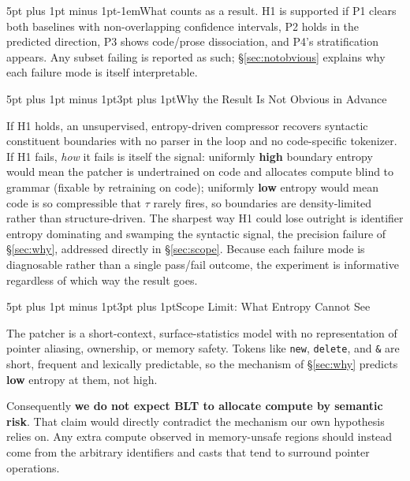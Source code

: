 \documentclass[9pt]{extarticle}
\makeatletter
\renewcommand\subsection{\@startsection{subsection}{2}{0pt}%
  {5pt plus 1pt minus 1pt}{3pt plus 1pt}{\normalfont\normalsize\bfseries}}
\renewcommand\paragraph{\@startsection{paragraph}{4}{0pt}%
  {5pt plus 1pt minus 1pt}{-1em}{\normalfont\normalsize\bfseries}}
\newcommand{\code}[1]{\texttt{\small #1}}
\makeatother
\begin{document}
\paragraph{What counts as a result.} H1 is supported if P1 clears both baselines
with non-overlapping confidence intervals, P2 holds in the predicted direction,
P3 shows code/prose dissociation, and P4's stratification appears. Any subset
failing is reported as such; \S\ref{sec:notobvious} explains why each failure mode
is itself interpretable.

\subsection{Why the Result Is Not Obvious in Advance}
\label{sec:notobvious}

If H1 holds, an unsupervised, entropy-driven compressor recovers syntactic
constituent boundaries with no parser in the loop and no code-specific
tokenizer. If H1 fails, \emph{how} it fails is itself the signal: uniformly
\textbf{high} boundary entropy would mean the patcher is undertrained on code
and allocates compute blind to grammar (fixable by retraining on code);
uniformly \textbf{low} entropy would mean code is so compressible that $\tau$
rarely fires, so boundaries are density-limited rather than structure-driven.
The sharpest way H1 could lose outright is identifier entropy dominating and
swamping the syntactic signal, the precision failure of \S\ref{sec:why},
addressed directly in \S\ref{sec:scope}. Because each failure mode is
diagnosable rather than a single pass/fail outcome, the experiment is
informative regardless of which way the result goes.

\subsection{Scope Limit: What Entropy Cannot See}
\label{sec:scope}

The patcher is a short-context, surface-statistics model with no representation of
pointer aliasing, ownership, or memory safety. Tokens like \code{new},
\code{delete}, \code{*} and \code{\&} are short, frequent and lexically
predictable, so the mechanism of \S\ref{sec:why} predicts \textbf{low} entropy at
them, not high.

Consequently \textbf{we do not expect BLT to allocate compute by semantic risk}.
That claim would directly contradict the mechanism our own hypothesis relies on.
Any extra compute observed in memory-unsafe regions should instead come from the
arbitrary identifiers and casts that tend to surround pointer operations.
\end{document}
